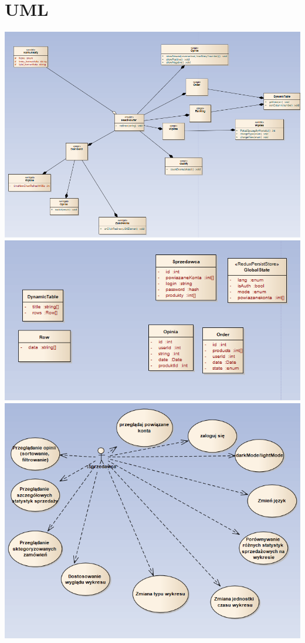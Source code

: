 \documentclass[a4paper,11pt]{article}
\begin{document}
\section{UML}
\includegraphics[scale=0.5]{src/routes.png}\\
\includegraphics[scale=0.5]{src/class.png}\\
\includegraphics[scale=0.5]{src/uc.png}\\
\end{document}
